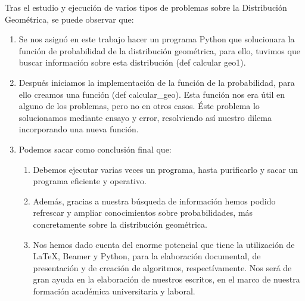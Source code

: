 Tras el estudio y ejecuci\'on de varios tipos de problemas sobre la Distribuci\'on Geom\'etrica, se puede observar que:\\
\begin{enumerate}
	 \item Se nos asign\'o en este trabajo  hacer un programa Python que solucionara la funci\'on de probabilidad de la distribuci\'on geom\'etrica, para ello, tuvimos que buscar informaci\'on sobre esta distribuci\'on (def calcular geo1).

\item Despu\'es iniciamos la implementaci\'on de la funci\'on de la probabilidad, para ello creamos una funci\'on (def calcular\_geo).
   Esta funci\'on nos era \'util en alguno de los problemas, pero no en otros casos. \'Este problema lo solucionamos mediante ensayo y error, resolviendo as\'i nuestro dilema incorporando una nueva funci\'on.
  \item Podemos sacar como conclusi\'on final que:
   \begin{enumerate}
   	 \item Debemos ejecutar varias veces un programa, hasta purificarlo y sacar un programa eficiente y operativo.

     \item Adem\'as, gracias a nuestra b\'usqueda de informaci\'on hemos podido refrescar y ampliar conocimientos sobre probabilidades, m\'as concretamente sobre la distribuci\'on geom\'etrica.
     \item Nos hemos dado cuenta del enorme potencial que tiene la utilizaci\'on de \LaTeX, Beamer y Python, para la elaboraci\'on documental, de presentaci\'on y de creaci\'on de algoritmos, respect\'ivamente. Nos ser\'a de gran ayuda en la elaboraci\'on de nuestros escritos, en el marco de nuestra formaci\'on acad\'emica universitaria y laboral.
   \end{enumerate}

\end{enumerate}




